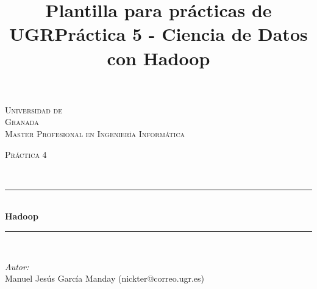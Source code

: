 \documentclass[10pt]{article}
\title{Plantilla para prácticas de UGR}
\title{Práctica 5 - Ciencia de Datos con Hadoop}
\begin{document}
\begin{center}																		%
\newcommand{\HRule}{\rule{\linewidth}{0.5mm}}									%
\begin{minipage}{0.48\textwidth} \begin{flushleft}
\end{flushleft}\end{minipage}
\begin{minipage}{0.48\textwidth} \begin{flushright}
\end{flushright}\end{minipage}

\vspace*{-1.5cm}								%
\textsc{\huge Universidad de\\ \vspace{5px} Granada}\\[1.5cm]	

\textsc{\LARGE Master Profesional en Ingenier\'ia Inform\'atica }\\[1.5cm]													%

\begin{minipage}{0.9\textwidth} 
\begin{center}																					%
\textsc{\LARGE Pr\'actica 4}
\end{center}
\end{minipage}\\[0.5cm]
 			\vspace*{1cm}																		%
\HRule \\[0.4cm]																	%
{ \huge \bfseries Hadoop}\\[0.4cm]	%
\HRule \\[1.5cm]																	%
\begin{minipage}{0.46\textwidth}													%
\begin{flushleft} \large															%
\emph{Autor:}\\	
Manuel Jes\'us Garc\'ia Manday (nickter@correo.ugr.es)\\
\end{flushleft}																		%
\end{minipage}		
\begin{minipage}{0.52\textwidth}		
\vspace{-0.6cm}											%
\begin{flushright} \large															%
\end{flushright}																	%
\end{minipage}	
\vspace*{1cm}
 	

\end{center}
\end{document}

